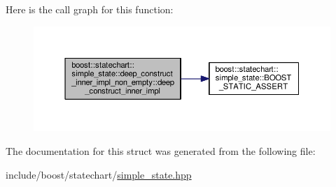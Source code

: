 Here is the call graph for this function\+:
\nopagebreak
\begin{figure}[H]
\begin{center}
\leavevmode
\includegraphics[width=350pt]{structboost_1_1statechart_1_1simple__state_1_1deep__construct__inner__impl__non__empty_a5e9e6ad9f24ac1eea0c3b2dc8d12cad0_cgraph}
\end{center}
\end{figure}


The documentation for this struct was generated from the following file\+:\begin{DoxyCompactItemize}
\item 
include/boost/statechart/\mbox{\hyperlink{simple__state_8hpp}{simple\+\_\+state.\+hpp}}\end{DoxyCompactItemize}
